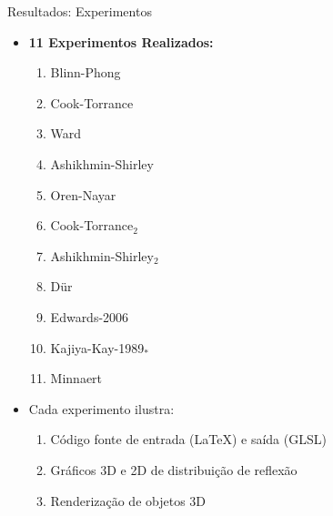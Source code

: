 \begin{frame}{Resultados: Experimentos}

\begin{itemize}
\item \textbf{11 Experimentos Realizados:}
    \begin{enumerate}
        \item Blinn-Phong
        \item Cook-Torrance
        \item Ward 
        \item Ashikhmin-Shirley
        \item Oren-Nayar 
        \item Cook-Torrance$_2$
        \item Ashikhmin-Shirley$_2$ 
        \item Dür
        \item Edwards-2006
        \item Kajiya-Kay-1989$_*$
        \item Minnaert
    \end{enumerate}

\item Cada experimento ilustra:
         \begin{enumerate}
             \item Código fonte de entrada (\LaTeX{}) e saída (GLSL)
             \item Gráficos 3D e 2D de distribuição de reflexão
             \item Renderização de objetos 3D
         \end{enumerate}

    \end{itemize}
\end{frame}





